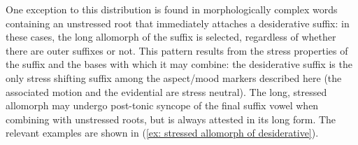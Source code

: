     \z
\z

One exception to this distribution is found in morphologically complex words containing an unstressed root that immediately attaches a desiderative suffix: in these cases, the long allomorph of the suffix is selected, regardless of whether there are outer suffixes or not. This pattern results from the stress properties of the suffix and the bases with which it may combine: the desiderative suffix is the only stress shifting suffix among the aspect/mood markers described here (the associated motion and the evidential are stress neutral). The long, stressed allomorph may undergo post-tonic syncope of the final suffix vowel when combining with unstressed roots, but is always attested in its long form. The relevant examples are shown in (\ref{ex: stressed allomorph of desiderative}).

